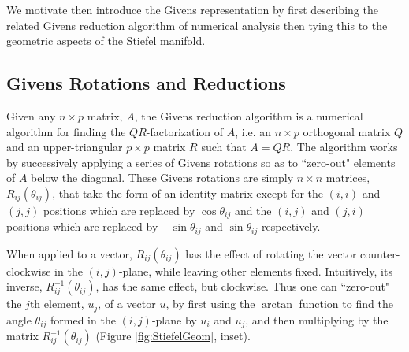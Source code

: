 \documentclass[ba]{imsart}
\numberwithin{equation}{section}
\theoremstyle{plain}
\begin{document}
We motivate then introduce the Givens representation by first describing the related Givens reduction algorithm of numerical analysis then tying this to the geometric aspects of the Stiefel manifold.

\subsection{Givens Rotations and Reductions}
Given any $n \times p$ matrix, $A$, the Givens reduction algorithm is a numerical algorithm for finding the $QR$-factorization of $A$, i.e. an $n\times p$ orthogonal matrix $Q$ and an upper-triangular $p \times p$ matrix $R$ such that $A = QR$. The algorithm works by successively applying a series of Givens rotations so as to ``zero-out" elements of $A$ below the diagonal. These Givens rotations are simply $n \times n$ matrices, $R_{ij}(\theta_{ij})$, that take the form of an identity matrix except for the $(i,i)$ and $(j,j)$ positions which are replaced by $\cos \theta_{ij}$ and the $(i,j)$ and $(j,i)$ positions which are replaced by $-\sin \theta_{ij}$ and $\sin \theta_{ij}$ respectively.

\noindent When applied to a vector, $R_{ij}(\theta_{ij})$ has the effect of rotating the vector counter-clockwise in the $(i,j)$-plane, while leaving other elements fixed. Intuitively, its inverse, $R_{ij}^{-1}(\theta_{ij})$, has the same effect, but clockwise. Thus one can ``zero-out" the $j$th element, $u_j$, of a vector $u$, by first using the $\arctan$ function to find the angle $\theta_{ij}$ formed in the $(i,j)$-plane by $u_i$ and $u_j$, and then multiplying by the matrix $R_{ij}^{-1}(\theta_{ij})$ (Figure \ref{fig:StiefelGeom}, inset).

\end{document}
